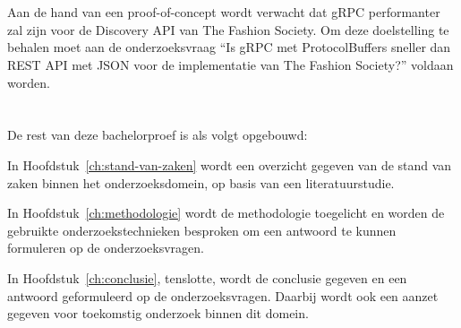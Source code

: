 \section{}
\label{sec:onderzoeksdoelstelling}

Aan de hand van een proof-of-concept wordt verwacht dat gRPC performanter zal zijn voor de Discovery API van The Fashion Society. Om deze doelstelling te behalen moet aan de onderzoeksvraag “Is gRPC met ProtocolBuffers sneller dan REST API met JSON voor de implementatie van The Fashion Society?” voldaan worden.

\section{}
\label{sec:opzet-bachelorproef}


De rest van deze bachelorproef is als volgt opgebouwd:

In Hoofdstuk~\ref{ch:stand-van-zaken} wordt een overzicht gegeven van de stand van zaken binnen het onderzoeksdomein, op basis van een literatuurstudie.

In Hoofdstuk~\ref{ch:methodologie} wordt de methodologie toegelicht en worden de gebruikte onderzoekstechnieken besproken om een antwoord te kunnen formuleren op de onderzoeksvragen.


In Hoofdstuk~\ref{ch:conclusie}, tenslotte, wordt de conclusie gegeven en een antwoord geformuleerd op de onderzoeksvragen. Daarbij wordt ook een aanzet gegeven voor toekomstig onderzoek binnen dit domein.